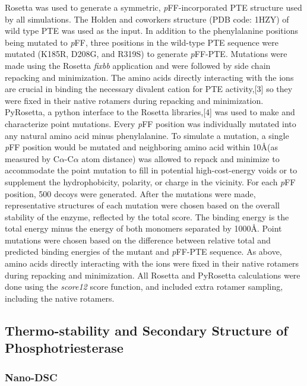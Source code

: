\begin{refsection}
Rosetta\cite{Leaver-Fay2011,DiMaio2011a} was used to generate a symmetric,
\emph{p}FF-incorporated PTE structure used by all simulations. The Holden and
coworkers structure (PDB code: 1HZY) of wild type PTE was used as the input. In
addition to the phenylalanine positions being mutated to \emph{p}FF, three
positions in the wild-type PTE sequence were mutated (K185R, D208G, and R319S)
to generate \emph{p}FF-PTE.\cite{Roodveldt2005} Mutations were made using the
Rosetta \emph{fixbb} application and were followed by side chain repacking and
minimization. The amino acids directly interacting with the  ions
are crucial in binding the necessary divalent cation for PTE activity,[3] so
they were fixed in their native rotamers during repacking and minimization.
PyRosetta, a python interface to the Rosetta libraries,[4] was used to make and
characterize point mutations. Every \emph{p}FF position was individually
mutated into any natural amino acid minus phenylalanine. To simulate a
mutation, a single \emph{p}FF position would be mutated and neighboring amino
acid within 10\AA (as measured by C$\alpha$-C$\alpha$ atom distance) was
allowed to repack and minimize to accommodate the point mutation to fill in
potential high-cost-energy voids or to supplement the hydrophobicity, polarity,
or charge in the vicinity. For each \emph{p}FF position, 500 decoys were
generated. After the mutations were made, representative structures of each
mutation were chosen based on the overall stability of the enzyme, reflected by
the total score. The binding energy is the total energy minus the energy of
both monomers separated by 1000\AA. Point mutations were chosen based on the
difference between relative total and predicted binding energies of the mutant
and \emph{p}FF-PTE sequence. As above, amino acids directly interacting with
the  ions were fixed in their native rotamers during repacking and
minimization. All Rosetta and PyRosetta calculations were done using the
\emph{score12} score function, and included extra rotamer sampling, including
the native rotamers.

\subsection{Thermo-stability and Secondary Structure of Phosphotriesterase}
\label{sec:thermo}

\subsubsection{Nano-DSC}
\label{sec:dsc-method}


\end{refsection}
